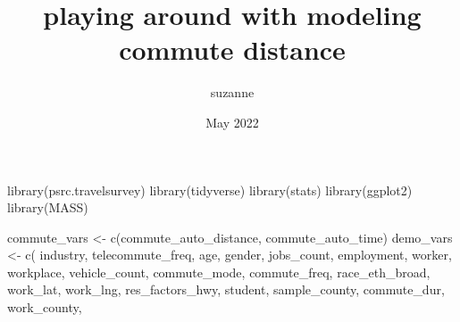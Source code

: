 \documentclass[
]{article}
\title{playing around with modeling commute distance}
\author{suzanne}
\date{May 2022}
\newenvironment{Shaded}{\begin{snugshade}}{\end{snugshade}}
\newcommand{\FunctionTok}[1]{\textcolor[rgb]{0.00,0.00,0.00}{#1}}
\newcommand{\NormalTok}[1]{#1}
\newcommand{\OtherTok}[1]{\textcolor[rgb]{0.56,0.35,0.01}{#1}}
\newcommand{\StringTok}[1]{\textcolor[rgb]{0.31,0.60,0.02}{#1}}
\begin{document}
\maketitle

{
\setcounter{tocdepth}{2}
\tableofcontents
}
\begin{Shaded}
\begin{Highlighting}[]
\FunctionTok{library}\NormalTok{(psrc.travelsurvey)}
\FunctionTok{library}\NormalTok{(tidyverse)}
\FunctionTok{library}\NormalTok{(stats)}
\FunctionTok{library}\NormalTok{(ggplot2)}
\FunctionTok{library}\NormalTok{(MASS)}
\end{Highlighting}
\end{Shaded}

\begin{Shaded}
\begin{Highlighting}[]
\NormalTok{commute\_vars }\OtherTok{\textless{}{-}} \FunctionTok{c}\NormalTok{(}\StringTok{\textquotesingle{}commute\_auto\_distance\textquotesingle{}}\NormalTok{, }\StringTok{\textquotesingle{}commute\_auto\_time\textquotesingle{}}\NormalTok{)}
\NormalTok{demo\_vars }\OtherTok{\textless{}{-}}
  \FunctionTok{c}\NormalTok{(}
    \StringTok{\textquotesingle{}industry\textquotesingle{}}\NormalTok{,}
    \StringTok{\textquotesingle{}telecommute\_freq\textquotesingle{}}\NormalTok{,}
    \StringTok{\textquotesingle{}age\textquotesingle{}}\NormalTok{,}
    \StringTok{\textquotesingle{}gender\textquotesingle{}}\NormalTok{,}
    \StringTok{\textquotesingle{}jobs\_count\textquotesingle{}}\NormalTok{,}
    \StringTok{\textquotesingle{}employment\textquotesingle{}}\NormalTok{,}
    \StringTok{\textquotesingle{}worker\textquotesingle{}}\NormalTok{,}
    \StringTok{\textquotesingle{}workplace\textquotesingle{}}\NormalTok{,}
    \StringTok{\textquotesingle{}vehicle\_count\textquotesingle{}}\NormalTok{,}
    \StringTok{\textquotesingle{}commute\_mode\textquotesingle{}}\NormalTok{,}
    \StringTok{\textquotesingle{}commute\_freq\textquotesingle{}}\NormalTok{,}
    \StringTok{\textquotesingle{}race\_eth\_broad\textquotesingle{}}\NormalTok{,}
    \StringTok{\textquotesingle{}work\_lat\textquotesingle{}}\NormalTok{,}
    \StringTok{\textquotesingle{}work\_lng\textquotesingle{}}\NormalTok{,}
    \StringTok{\textquotesingle{}res\_factors\_hwy\textquotesingle{}}\NormalTok{,}
    \StringTok{\textquotesingle{}student\textquotesingle{}}\NormalTok{,}
    \StringTok{\textquotesingle{}sample\_county\textquotesingle{}}\NormalTok{,}
    \StringTok{\textquotesingle{}commute\_dur\textquotesingle{}}\NormalTok{,}
    \StringTok{\textquotesingle{}work\_county\textquotesingle{}}\NormalTok{,}

\end{Highlighting}
\end{Shaded}
\end{document}
